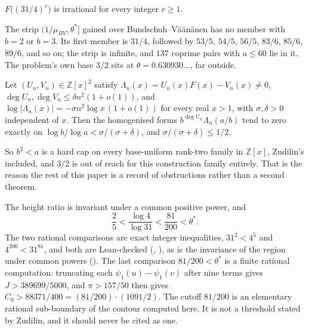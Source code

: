 \documentclass[11pt]{article}
\begin{document}
\begin{corollary}\label{res:thirtyone-four}
$F\bigl((31/4)^r\bigr)$ is irrational for every integer $r\ge1$.
\end{corollary}

\noindent The strip $(1/\mu_{BV},\theta^*]$ gained over
Bundschuh--V\"a\"an\"anen has no member with $b=2$ or $b=3$.  Its first member
is $31/4$, followed by $53/5$, $54/5$, $56/5$, $83/6$, $85/6$, $89/6$, and so
on; the strip is infinite, and $137$ coprime pairs with $a\le60$ lie in it.
The problem's own base $3/2$ sits at $\theta=0.630930\ldots$, far outside.

\begin{theorem}
\label{res:archimedean-cap}
Let $(U_n,V_n)\in\mathbb Z[x]^2$ satisfy $\Lambda_n(x)=U_n(x)F(x)-V_n(x)\ne0$,
$\deg U_n,\deg V_n\le\delta n^2(1+o(1))$, and
$\log|\Lambda_n(x)|=-\sigma n^2\log x\,(1+o(1))$ for every real $x>1$, with
$\sigma,\delta>0$ independent of $x$.  Then the homogenised forms
$b^{\deg U_n}\Lambda_n(a/b)$ tend to zero exactly on
$\log b/\log a<\sigma/(\sigma+\delta)$, and $\sigma/(\sigma+\delta)\le1/2$.
\end{theorem}

\noindent So $b^2<a$ is a hard cap on every base-uniform rank-two family in
$\mathbb Z[x]$, Zudilin's included, and $3/2$ is out of reach for this
construction family entirely.  That is the reason the rest of this paper is a
record of obstructions rather than a second theorem.

\noindent The height ratio is invariant under a common positive power, and
\[
  \frac25<\frac{\log4}{\log31}<\frac{81}{200}<\theta^* .
\]
The two rational comparisons are exact integer inequalities, $31^2<4^5$ and
$4^{200}<31^{81}$, and both are Lean-checked
(,
), as is the invariance of the region under common powers
().  The last comparison $81/200<\theta^*$ is a finite rational
computation: truncating each $\psi_1(u)-\psi_1(v)$ after nine terms gives
$J>389699/5000$, and $\pi>157/50$ then gives
$C_0>88371/400=(81/200)\cdot(1091/2)$.  The cutoff $81/200$ is an elementary
rational sub-boundary of the contour computed here.  It is not a threshold
stated by Zudilin, and it should never be cited as one.
\end{document}
